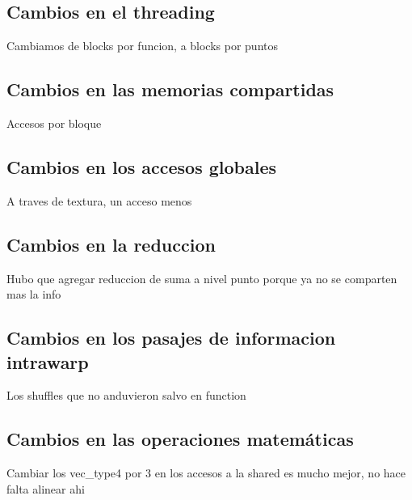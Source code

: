 \subsection{Cambios en el threading}
Cambiamos de blocks por funcion, a blocks por puntos
\subsection{Cambios en las memorias compartidas}
Accesos por bloque
\subsection{Cambios en los accesos globales}
A traves de textura, un acceso menos
\subsection{Cambios en la reduccion}
Hubo que agregar reduccion de suma a nivel punto porque ya no se comparten mas la info
\subsection{Cambios en los pasajes de informacion intrawarp}
Los shuffles que no anduvieron salvo en function
\subsection{Cambios en las operaciones matem\'aticas}
Cambiar los vec\_type4 por 3 en los accesos a la shared es mucho mejor, no hace falta alinear ahi
